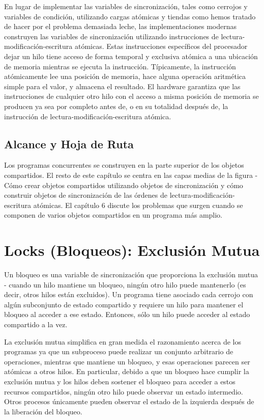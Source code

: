\documentclass[10pt]{book}
\begin{document}
\begin{itemize}
En lugar de implementar las variables de sincronización, tales como cerrojos y variables de condición, utilizando cargas atómicas y tiendas como hemos tratado de hacer por el problema demasiada leche, las implementaciones modernas construyen las variables de sincronización utilizando instrucciones de lectura-modificación-escritura atómicas. Estas instrucciones específicos del procesador dejar un hilo tiene acceso de forma temporal y exclusiva atómica a una ubicación de memoria mientras se ejecuta la instrucción. Típicamente, la instrucción atómicamente lee una posición de memoria, hace alguna operación aritmética simple para el valor, y almacena el resultado. El hardware garantiza que las instrucciones de cualquier otro hilo con el acceso a misma posición de memoria se producen ya sea por completo antes de, o en su totalidad después de, la instrucción de lectura-modificación-escritura atómica.
\end{itemize}

\subsection{Alcance y Hoja de Ruta}
Los programas concurrentes se construyen en la parte superior de los objetos compartidos. El resto de este capítulo se centra en las capas medias de la figura - Cómo crear objetos compartidos utilizando objetos de sincronización y cómo construir objetos de sincronización de las órdenes de lectura-modificación-escritura atómicas. El capítulo 6 discute los problemas que surgen cuando se componen de varios objetos compartidos en un programa más amplio.

\section{Locks (Bloqueos): Exclusión Mutua}
Un bloqueo es una variable de sincronización que proporciona la exclusión mutua - cuando un hilo mantiene un bloqueo, ningún otro hilo puede mantenerlo (es decir, otros hilos están excluidos). Un programa tiene asociado cada cerrojo con algún subconjunto de estado compartido y requiere un hilo para mantener el bloqueo al acceder a ese estado. Entonces, sólo un hilo puede acceder al estado compartido a la vez.

La exclusión mutua simplifica en gran medida el razonamiento acerca de los programas ya que un subproceso puede realizar un conjunto arbitrario de operaciones, mientras que mantiene un bloqueo, y esas operaciones parecen ser atómicas a otros hilos. En particular, debido a que un bloqueo hace cumplir la exclusión mutua y los hilos deben sostener el bloqueo para acceder a estos recursos compartidos, ningún otro hilo puede observar un estado intermedio. Otros procesos únicamente pueden observar el estado de la izquierda después de la liberación del bloqueo.
\end{document}

